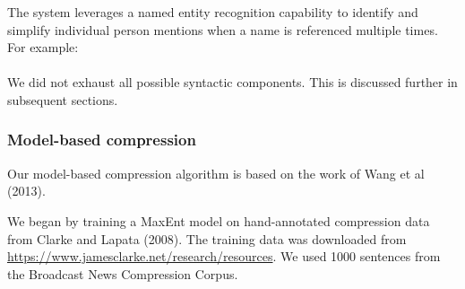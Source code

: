 \documentclass[11pt]{article}
\begin{document}
The system leverages a named entity recognition capability to identify and simplify individual person mentions when a name is referenced multiple times. For example:
\\

\\

We did not exhaust all possible syntactic components. This is discussed further in subsequent sections.

\subsubsection{Model-based compression}

Our model-based compression algorithm is based on the work of Wang et al (2013).

We began by training a MaxEnt model on hand-annotated compression data from Clarke and Lapata (2008). The training data was downloaded from \url{https://www.jamesclarke.net/research/resources}. We used 1000 sentences from the Broadcast News Compression Corpus.
\end{document}
